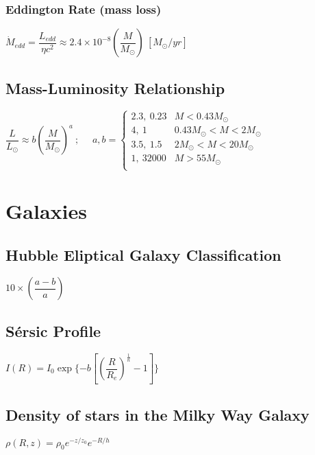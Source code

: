\subsubsection{Eddington Rate (mass loss)}
\begin{itemize}
\itemt \( \dot{M}_{edd} = \dfrac{L_{edd}}{\eta c^2} \approx 2.4 \times 10^{-8} (\dfrac{M}{M_\odot})\ [M_\odot / yr]\)
\end{itemize}

\subsection{Mass-Luminosity Relationship}
\begin{itemize}
\itemt \( \dfrac{L}{L_\odot} \approx b\left(\dfrac{M}{M_\odot}\right)^a\ ;\ \ \ \ \ \ a, b = \begin{cases} 
      2.3,\ 0.23	& M<0.43M_\odot \\
      4,\ 1			& 0.43M_\odot < M < 2M_\odot \\
      3.5,\ 1.5 	& 2M_\odot < M < 20M_\odot \\
      1,\ 32000 	& M > 55M_\odot \\
   \end{cases}
\)
\end{itemize}


	\section{Galaxies}

\subsection{Hubble Eliptical Galaxy Classification}			
\begin{itemize}
\itemt \( 10 \times \left(\dfrac{a-b}{a}\right) \)
\end{itemize}

\subsection{S\'ersic Profile}
\begin{itemize}
\itemt \( I(R) = I_0 \exp\{-b[\left(\dfrac{R}{R_e}\right)^\frac{1}{n}-1]\} \)
\end{itemize}

\subsection{Density of stars in the Milky Way Galaxy}
\begin{itemize}
\itemt \( \rho(R,z) = \rho_0 e^{-z/z_0} e^{-R/h} \)
\end{itemize}

